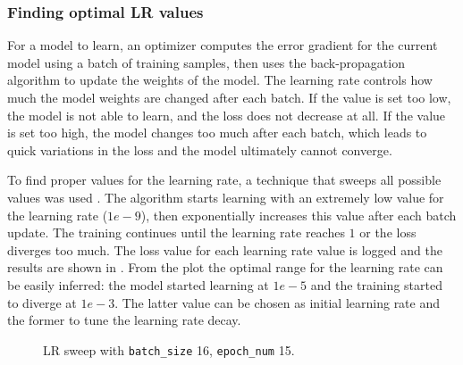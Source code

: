 \subsubsection{Finding optimal LR values}
\label{sec:lr_sweep}

For a model to learn, an optimizer computes the error gradient for the current
model using a batch of training samples, then uses the back-propagation
algorithm to update the weights of the model.
The learning rate controls how much the model weights are changed after each batch.
If the value is set too low, the model is not able to learn, and the loss does
not decrease at all.
If the value is set too high, the model changes too much after each batch,
which leads to quick variations in the loss and the model ultimately cannot
converge.

To find proper values for the learning rate, a technique that sweeps all
possible values was used \cite{PYISlearningsweep}.
The algorithm starts learning with an extremely low value for the learning rate
($1e-9$), then exponentially increases this value after each batch update. The
training continues until the learning rate reaches $1$ or the loss diverges too
much.
The loss value for each learning rate value is logged and the results are shown
in .
From the plot the optimal range for the learning rate can be easily inferred:
the model started learning at $1e-5$ and the training started to diverge at
$1e-3$. The latter value can be chosen as initial learning rate and the former
to tune the learning rate decay.

\begin{figure}[t!]
    \centering
    \caption{LR sweep with \texttt{batch\_size} 16, \texttt{epoch\_num} 15.}%
    \label{fig:LR_sweep_bs16_en15}
\end{figure}

